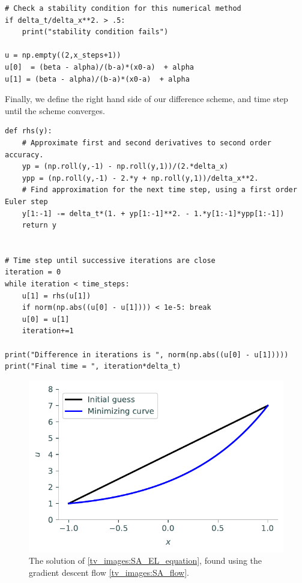 \begin{lstlisting}
# Check a stability condition for this numerical method
if delta_t/delta_x**2. > .5:
    print("stability condition fails")

u = np.empty((2,x_steps+1))
u[0]  = (beta - alpha)/(b-a)*(x0-a)  + alpha
u[1] = (beta - alpha)/(b-a)*(x0-a)  + alpha
\end{lstlisting}

Finally, we define the right hand side of our difference scheme, and time step until the scheme converges.
\begin{lstlisting}
def rhs(y):
    # Approximate first and second derivatives to second order accuracy.
    yp = (np.roll(y,-1) - np.roll(y,1))/(2.*delta_x)
    ypp = (np.roll(y,-1) - 2.*y + np.roll(y,1))/delta_x**2.
    # Find approximation for the next time step, using a first order Euler step
    y[1:-1] -= delta_t*(1. + yp[1:-1]**2. - 1.*y[1:-1]*ypp[1:-1])
    return y


# Time step until successive iterations are close
iteration = 0
while iteration < time_steps:
    u[1] = rhs(u[1])
    if norm(np.abs((u[0] - u[1]))) < 1e-5: break
    u[0] = u[1]
    iteration+=1

print("Difference in iterations is ", norm(np.abs((u[0] - u[1]))))
print("Final time = ", iteration*delta_t)
\end{lstlisting}

\begin{figure}
\centering
\includegraphics[width=\textwidth]{figures/min_surface_area.pdf}
\caption{The solution of \eqref{tv_images:SA_EL_equation}, found using the gradient descent flow \eqref{tv_images:SA_flow}.}
\label{fig:tv_images:SA_image}
\end{figure}

